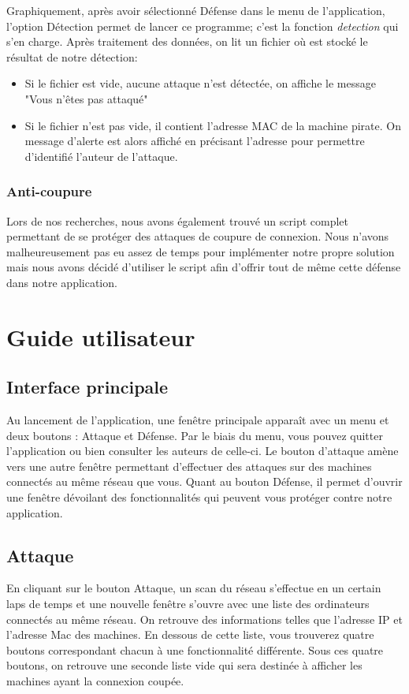 \documentclass[11pt]{article}
\begin{document}
Graphiquement, après avoir sélectionné Défense dans le menu de l'application, l'option Détection permet de lancer ce programme; c'est la fonction \textit{detection} qui s'en charge. Après traitement des données, on lit un fichier où est stocké le résultat de notre détection:
\begin{itemize}
	\item Si le fichier est vide, aucune attaque n'est détectée, on affiche le message "Vous n'êtes pas attaqué"
	\item Si le fichier n'est pas vide, il contient l'adresse MAC de la machine pirate. On message d'alerte est alors affiché en précisant l'adresse pour permettre d'identifié l'auteur de l'attaque.
	
\end{itemize}



\subsubsection{Anti-coupure}
Lors de nos recherches, nous avons également trouvé un script complet permettant de se protéger des attaques de coupure de connexion. Nous n'avons malheureusement pas eu assez de temps pour implémenter notre propre solution mais nous avons décidé d'utiliser le script afin d'offrir tout de même cette défense dans notre application.


\section{Guide utilisateur}
\subsection{Interface principale}
Au lancement de l'application, une fenêtre principale apparaît avec un menu et deux boutons : Attaque et Défense. Par le biais du menu, vous pouvez quitter l'application ou bien consulter les auteurs de celle-ci. Le bouton d'attaque amène vers une autre fenêtre permettant d'effectuer des attaques sur des machines connectés au même réseau que vous. Quant au bouton Défense, il permet d'ouvrir une fenêtre dévoilant des fonctionnalités qui peuvent vous protéger contre notre application.

\subsection{Attaque}
En cliquant sur le bouton Attaque, un scan du réseau s'effectue en un certain laps de temps et une nouvelle fenêtre s'ouvre avec une liste des ordinateurs connectés au même réseau. On retrouve des informations telles que l'adresse IP et l'adresse Mac des machines. En dessous de cette liste, vous trouverez quatre boutons  correspondant chacun à une fonctionnalité différente. Sous ces quatre boutons, on retrouve une seconde liste vide qui sera destinée à afficher les machines ayant la connexion coupée.
\end{document}
